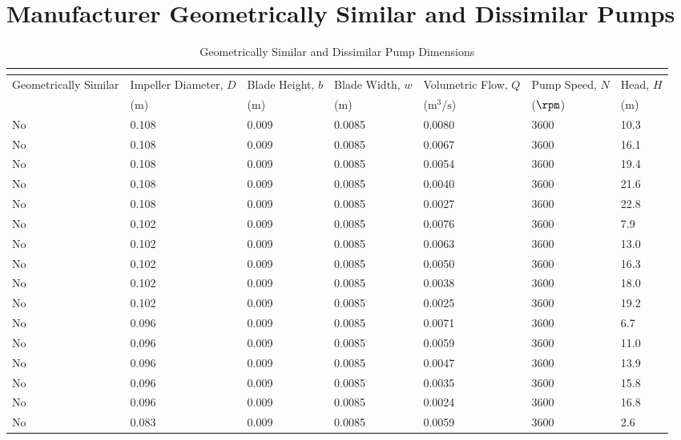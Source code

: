 \section{Manufacturer Geometrically Similar and Dissimilar Pumps}
\label{sec:geometrically_similar_pumps}
\begin{longtable}{p{}C{0.10\textwidth}C{0.10\textwidth}C{0.10\textwidth}C{0.10\textwidth}C{0.10\textwidth}C{0.10\textwidth}}
    \caption{Geometrically Similar and Dissimilar Pump Dimensions} \\
    \label{tab:geometrically_similar_pumps} \\[-8ex]
    \toprule
    Geometrically Similar & Impeller Diameter, $D$ & Blade Height, $b$ & Blade Width, $w$ & Volumetric Flow, $Q$ & Pump Speed, $N$ & Head, $H$ \\
    & ($\unit{\meter}$) & ($\unit{\meter}$) & ($\unit{\meter}$) & ($\unit{\meter\cubed\per\second}$) & ($\unit{\rpm}$) & ($\unit{\meter}$) \\
    \midrule
    No & 0.108 & 0.009 & 0.0085 & 0.0080 & 3600 & 10.3 \\
    No & 0.108 & 0.009 & 0.0085 & 0.0067 & 3600 & 16.1 \\
    No & 0.108 & 0.009 & 0.0085 & 0.0054 & 3600 & 19.4 \\
    No & 0.108 & 0.009 & 0.0085 & 0.0040 & 3600 & 21.6 \\
    No & 0.108 & 0.009 & 0.0085 & 0.0027 & 3600 & 22.8 \\
    No & 0.102 & 0.009 & 0.0085 & 0.0076 & 3600 & 7.9 \\
    No & 0.102 & 0.009 & 0.0085 & 0.0063 & 3600 & 13.0 \\
    No & 0.102 & 0.009 & 0.0085 & 0.0050 & 3600 & 16.3 \\
    No & 0.102 & 0.009 & 0.0085 & 0.0038 & 3600 & 18.0 \\
    No & 0.102 & 0.009 & 0.0085 & 0.0025 & 3600 & 19.2 \\
    No & 0.096 & 0.009 & 0.0085 & 0.0071 & 3600 & 6.7 \\
    No & 0.096 & 0.009 & 0.0085 & 0.0059 & 3600 & 11.0 \\
    No & 0.096 & 0.009 & 0.0085 & 0.0047 & 3600 & 13.9 \\
    No & 0.096 & 0.009 & 0.0085 & 0.0035 & 3600 & 15.8 \\
    No & 0.096 & 0.009 & 0.0085 & 0.0024 & 3600 & 16.8 \\
    No & 0.083 & 0.009 & 0.0085 & 0.0059 & 3600 & 2.6 \\

\end{longtable}
